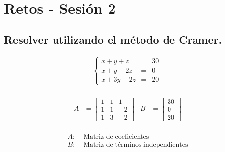 \documentclass[11pt, a4paper]{article}
\begin{document}
\section{Retos - Sesión 2}
\subsection{Resolver utilizando el método de Cramer.}
\vspace{-0.5cm}
\begin{multicols}{3}
  \begin{align*}
    \left\{
    \begin{array}{rcl}
      x+y+z &= &30\\
      x+y-2z &= &0\\
      x+3y-2z &= &20
    \end{array}
    \right.\
  \end{align*}
  \columnbreak\\
  \begin{align*}
    A &= \begin{bmatrix}
      1 & 1 & 1\\
      1 & 1 & -2\\
      1 & 3 & -2
    \end{bmatrix}&
    B &= \begin{bmatrix}
      30\\
      0\\
      20
    \end{bmatrix}
  \end{align*}
  \columnbreak\\
  \vspace{-0.5cm}
  \begin{align*}
    A: &\text{ Matriz de coeficientes}\\
    B: &\text{ Matriz de términos independientes}\\
  \end{align*}
\end{multicols}
\vspace{-0.5cm}
\end{document}
